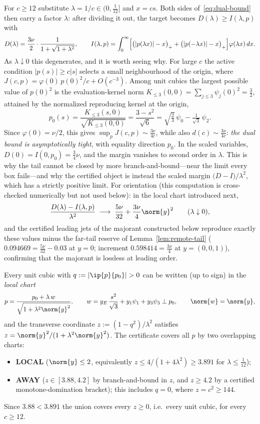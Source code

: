 For $c\ge12$ substitute $\lambda=1/c\in(0,\tfrac1{12}]$ and $x=cs$. Both sides of~\eqref{eq:dual-bound} then carry a factor $\lambda$: after dividing it out, the target becomes $D(\lambda)\ge I(\lambda,p)$ with
\[
        D(\lambda)=\frac{3\nu}{2}\cdot\frac{1}{1+\sqrt{1+\lambda^2}},
        \qquad
        I(\lambda,p)=\int_0^\infty\Bigl[\bigl(|p(\lambda x)|-x\bigr)_++\bigl(|p(-\lambda x)|-x\bigr)_+\Bigr]\varphi(\lambda x)\,dx .
\]
As $\lambda\downarrow0$ this degenerates, and it is worth seeing why. For large $c$ the active condition $|p(s)|\ge c|s|$ selects a small neighbourhood of the origin, where $J(c,p)=\varphi(0)\,p(0)^2/c+O(c^{-3})$. Among unit cubics the largest possible value of $p(0)^2$ is the evaluation-kernel norm $K_{\le3}(0,0)=\sum_{j\le3}\psi_j(0)^2=\tfrac32$, attained by the normalized reproducing kernel at the origin,
\[
        p_0(s)=\frac{K_{\le3}(s,0)}{\sqrt{K_{\le3}(0,0)}}=\frac{3-s^2}{\sqrt6}=\sqrt{\tfrac23}\,\psi_0-\tfrac{1}{\sqrt3}\,\psi_2 .
\]
Since $\varphi(0)=\nu/2$, this gives $\sup_pJ(c,p)\sim\tfrac{3\nu}{4c}$, while also $d(c)\sim\tfrac{3\nu}{4c}$: \emph{the dual bound is asymptotically tight}, with equality direction $p_0$. In the scaled variables, $D(0)=I(0,p_0)=\tfrac34\nu$, and the margin vanishes to second order in $\lambda$. This is why the tail cannot be closed by more branch-and-bound---near the limit every box fails---and why the certified object is instead the scaled margin $\bigl(D-I\bigr)/\lambda^2$, which has a strictly positive limit. For orientation (this computation is cross-checked numerically but not used below): in the local chart introduced next,
\[
        \frac{D(\lambda)-I(\lambda,p)}{\lambda^2}
        \;\longrightarrow\;
        \frac{5\nu}{32}+\frac{3\nu}{4}\norm{y}^2
        \qquad(\lambda\downarrow0),
\]
and the certified leading jets of the majorant constructed below reproduce exactly these values minus the far-tail reserve of Lemma~\ref{lem:remote-tail} ($0.094669=\tfrac{5\nu}{32}-0.03$ at $y=0$; increment $0.598414=\tfrac{3\nu}{4}$ at $y=(0,0,1)$), confirming that the majorant is lossless at leading order.

Every unit cubic with $q:=|\ip{p}{p_0}|>0$ can be written (up to sign) in the \emph{local chart}
\[
        p=\frac{p_0+\lambda\,w}{\sqrt{1+\lambda^2\norm{y}^2}},
        \qquad
        w=y_E\,\frac{s^2}{\sqrt3}+y_1\psi_1+y_3\psi_3\perp p_0,
        \qquad
        \norm{w}=\norm{y},
\]
and the transverse coordinate $z:=(1-q^2)/\lambda^2$ satisfies $z=\norm{y}^2/(1+\lambda^2\norm{y}^2)$. The certificate covers all $p$ by two overlapping charts:
\begin{itemize}
\item \textbf{LOCAL} ($\norm{y}\le2$, equivalently $z\le4/(1+4\lambda^2)\ge3.891$ for $\lambda\le\tfrac1{12}$);
\item \textbf{AWAY} ($z\in[3.88,4.2]$ by branch-and-bound in $z$, and $z\ge4.2$ by a certified monotone-domination bracket); this includes $q=0$, where $z=c^2\ge144$.
\end{itemize}
Since $3.88<3.891$ the union covers every $z\ge0$, i.e.\ every unit cubic, for every $c\ge12$.

